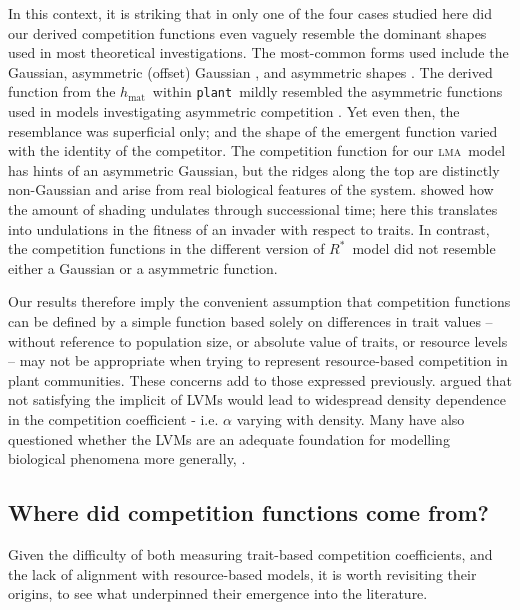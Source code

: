 \documentclass[a4paper,11pt]{article}
\newcommand{\Rstar}{\ensuremath{R^*}}
\newcommand{\plant}{{\tt plant}}
\newcommand{\hmat}{\ensuremath{h_{\text{mat}}}}
\newcommand{\lma}{\textsc{lma}}
\begin{document}
In this context, it is striking that in only one of the four cases studied here did our derived competition functions even vaguely resemble the dominant shapes used in most theoretical investigations. The most-common forms used include the Gaussian, asymmetric (offset) Gaussian \citep{Roughgarden-1979}, and asymmetric shapes \citep[e.g.][]{Kisdi-1999, Law-1997}. The derived function from the \hmat\ within \plant\ mildly resembled the asymmetric functions used in models investigating asymmetric competition \citep{Law-1997, Geritz-1999, Kisdi-1999, Calcagno-2006}. Yet even then, the resemblance was superficial only; and the shape of the emergent function varied with the identity of the competitor. The competition function for our \lma\ model has hints of an asymmetric Gaussian, but the ridges along the top are distinctly non-Gaussian and arise from real biological features of the system. \citet{Falster-2011} showed how the amount of shading undulates through successional time; here this translates into undulations in the fitness of an invader with respect to traits. In contrast, the competition functions in the different version of \Rstar\ model did not resemble either a Gaussian or a asymmetric function.

Our results therefore imply the convenient assumption that competition functions can be defined by a simple function based solely on differences in trait values -- without reference to population size, or absolute value of traits, or resource levels -- may not be appropriate when trying to represent resource-based competition in plant communities. These concerns add to those expressed previously. \citet{Abrams-1980} argued that not satisfying the implicit of LVMs would lead to widespread density dependence in the competition coefficient - i.e. $\alpha$ varying with density. Many have also questioned whether the LVMs are an adequate foundation for modelling biological phenomena more generally, \citep[e.g.][]{Andrewartha-1953, Neill-1974, Abrams-1975, Wangersky-1978,Abrams-1980, Tilman-1987, Abrams-2008}.

\subsection{Where did competition functions come from?}

Given the difficulty of both measuring trait-based competition coefficients, and the lack of alignment with resource-based models, it is worth revisiting their origins, to see what underpinned their emergence into the literature.
\end{document}
